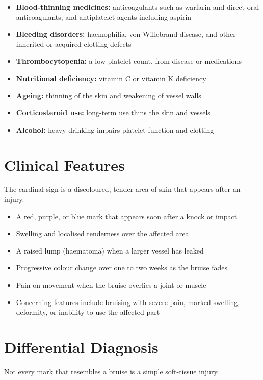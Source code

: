 \begin{itemize}
    \item \textbf{Blood-thinning medicines:} anticoagulants such as warfarin and direct oral anticoagulants, and antiplatelet agents including aspirin
    \item \textbf{Bleeding disorders:} haemophilia, von Willebrand disease, and other inherited or acquired clotting defects
    \item \textbf{Thrombocytopenia:} a low platelet count, from disease or medications
    \item \textbf{Nutritional deficiency:} vitamin C or vitamin K deficiency
    \item \textbf{Ageing:} thinning of the skin and weakening of vessel walls
    \item \textbf{Corticosteroid use:} long-term use thins the skin and vessels
    \item \textbf{Alcohol:} heavy drinking impairs platelet function and clotting
\end{itemize}

\section*{Clinical Features}
The cardinal sign is a discoloured, tender area of skin that appears after an injury.

\begin{itemize}
    \item A red, purple, or blue mark that appears soon after a knock or impact
    \item Swelling and localised tenderness over the affected area
    \item A raised lump (haematoma) when a larger vessel has leaked
    \item Progressive colour change over one to two weeks as the bruise fades
    \item Pain on movement when the bruise overlies a joint or muscle
    \item Concerning features include bruising with severe pain, marked swelling, deformity, or inability to use the affected part
\end{itemize}

\section*{Differential Diagnosis}
Not every mark that resembles a bruise is a simple soft-tissue injury.

